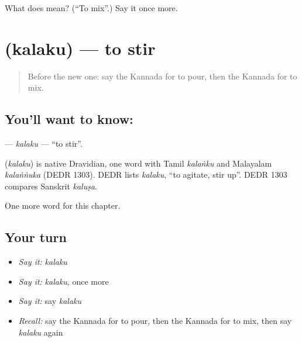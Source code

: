 \begin{tcolorbox}[breakable,colback=teal!4,colframe=teal!35!black,title={Before you move on}]
What does  mean? (\textquotedblleft{}To mix\textquotedblright{}.) Say it once more.
\end{tcolorbox}
\section[\texorpdfstring{\kn{ಕಲಕು} (kalaku)}{ಕಲಕು (kalaku)}]{ (kalaku) — to stir}

\label{lesson:KA-C272-kalaku}



\begin{quote}
Before the new one: say the Kannada for to pour, then the Kannada for to mix.
\end{quote}

\subsection*{You'll want to know: }
\textbf{} — \emph{kalaku} — \textquotedblleft{}to stir\textquotedblright{}.

\begin{cousinweb}
\textbf{} (\emph{kalaku}) is native Dravidian, one word with Tamil \emph{kalaṅku} and Malayalam \emph{kalaṅṅuka} (DEDR 1303). DEDR lists \emph{kalaku}, \textquotedblleft{}to agitate, stir up\textquotedblright{}. DEDR 1303 compares Sanskrit \emph{kaluṣa}.
\end{cousinweb}

\begin{grammarlens}[title={What you've built}]
One more word for this chapter.
\end{grammarlens}

\subsection*{Your turn}
\begin{itemize}
\raggedright
  \item \emph{Say it:} \emph{kalaku}
  \item \emph{Say it:} \emph{kalaku}, once more
  \item \emph{Say it:} say \emph{kalaku}
  \item \emph{Recall:} say the Kannada for to pour, then the Kannada for to mix, then say \emph{kalaku} again
\end{itemize}

